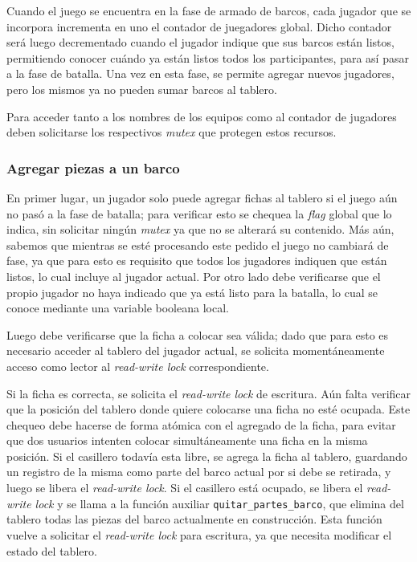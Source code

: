 \documentclass[a4paper]{article}
\begin{document}
Cuando el juego se encuentra en la fase de armado de barcos, cada jugador
que se incorpora incrementa en uno el contador de juegadores global. Dicho
contador será luego decrementado cuando el jugador indique que sus barcos
están listos, permitiendo conocer cuándo ya están listos todos los
participantes, para así pasar a la fase de batalla. Una vez en esta fase, se
permite agregar nuevos jugadores, pero los mismos ya no pueden sumar barcos
al tablero.

Para acceder tanto a los nombres de los equipos como al contador de jugadores
deben solicitarse los respectivos \emph{mutex} que protegen estos recursos.


\subsubsection{Agregar piezas a un barco}

En primer lugar, un jugador solo puede agregar fichas al tablero si el juego
aún no pasó a la fase de batalla; para verificar esto se chequea la
\emph{flag} global que lo indica, sin solicitar ningún \emph{mutex} ya que no
se alterará su contenido. Más aún, sabemos que mientras se esté procesando
este pedido el juego no cambiará de fase, ya que para esto es requisito que
todos los jugadores indiquen que están listos, lo cual incluye al jugador
actual. Por otro lado debe verificarse que el propio jugador no haya indicado
que ya está listo para la batalla, lo cual se conoce mediante una variable
booleana local.

Luego debe verificarse que la ficha a colocar sea válida; dado que para esto
es necesario acceder al tablero del jugador actual, se solicita
momentáneamente acceso como lector al \emph{read-write lock} correspondiente.

Si la ficha es correcta, se solicita el \emph{read-write lock} de escritura.
Aún falta verificar que la posición del tablero donde quiere colocarse una
ficha no esté ocupada. Este chequeo debe hacerse de forma atómica con el
agregado de la ficha, para evitar que dos usuarios intenten colocar
simultáneamente una ficha en la misma posición. Si el casillero todavía esta
libre, se agrega la ficha al tablero, guardando un registro de la misma como
parte del barco actual por si debe se retirada, y luego se libera el
\emph{read-write lock}. Si el casillero está ocupado, se libera el
\emph{read-write lock} y se llama a la función auxiliar
\texttt{quitar\_partes\_barco}, que elimina del tablero todas las piezas del
barco actualmente en construcción. Esta función vuelve a solicitar el \emph
{read-write lock} para escritura, ya que necesita modificar el estado del
tablero.
\end{document}
